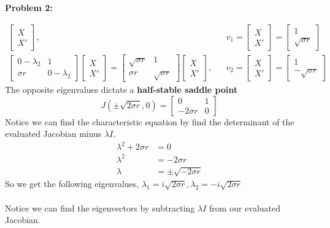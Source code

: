 \documentclass[11pt]{article}
\newenvironment{problem}[1]{\textbf{Problem #1: }}{\newpage}
\begin{document}
\begin{problem}{2}
\begin{enumerate}[label = (\alph*)]
\begin{align*}
\begin{bmatrix}
				X \\ X'
				\end{bmatrix}, && v_1 = \begin{bmatrix}
					X \\ X'
				\end{bmatrix} = \begin{bmatrix}
					1 \\ \sqrt{\sigma r}
				\end{bmatrix}
				\\
				\begin{bmatrix}
				0-\lambda_2 & 1 \\ \sigma r & 0-\lambda_2
				\end{bmatrix}\begin{bmatrix}
				X \\ X'
				\end{bmatrix} = 
				\begin{bmatrix}
				\sqrt{\sigma r} & 1 \\ \sigma r & \sqrt{\sigma r}
				\end{bmatrix}\begin{bmatrix}
				X \\ X'
				\end{bmatrix}, && v_2 = \begin{bmatrix}
				X \\ X'
				\end{bmatrix} = \begin{bmatrix}
				1 \\ -\sqrt{\sigma r}
				\end{bmatrix}
			\end{align*}
			The opposite eigenvalues dictate a \textbf{half-stable saddle point}
			\[J(\pm \sqrt{2\sigma r},0)= \begin{bmatrix}
			0 & 1 \\ -2\sigma r & 0 
			\end{bmatrix}\]
			Notice we can find the characteristic equation by find the determinant of the evaluated Jacobian minus $\lambda I$.
			\begin{align*}
				\lambda^2 + 2\sigma r &= 0 \\
				\lambda^2 &= -2\sigma r \\
				\lambda &= \pm \sqrt{-2\sigma r}
			\end{align*}
			So we get the following eigenvalues, $\lambda_1 = i\sqrt{2\sigma r}, \lambda_2 = -i\sqrt{2\sigma r}$
			\\ \\
			Notice we can find the eigenvectors by subtracting $\lambda I$ from our evaluated Jacobian.

\end{enumerate}
\end{problem}
\end{document}

